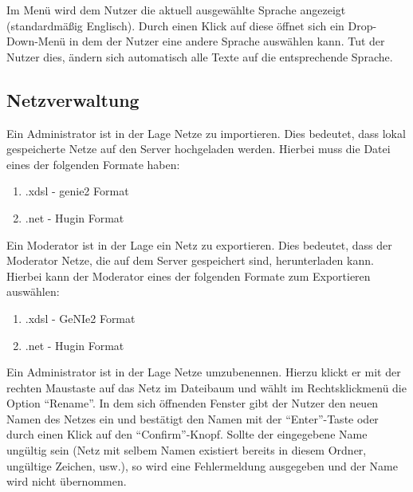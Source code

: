 \documentclass[parskip=full,11pt,twoside]{scrartcl}
\begin{document}
Im Menü wird dem Nutzer die aktuell ausgewählte Sprache angezeigt (standardmäßig Englisch). Durch einen Klick auf diese öffnet sich ein Drop-Down-Menü in dem der Nutzer eine andere Sprache auswählen kann. Tut der Nutzer dies, ändern sich automatisch alle Texte auf die entsprechende Sprache.

\pagebreak
\subsection{Netzverwaltung}  


Ein Administrator ist in der Lage Netze zu importieren. Dies bedeutet, dass lokal gespeicherte Netze auf den Server hochgeladen werden. Hierbei muss die Datei eines der folgenden Formate haben:
\begin{enumerate}
    \item .xdsl - \gls{genie2} Format
    \item .net - Hugin Format %
    
\end{enumerate}
Ein Moderator ist in der Lage ein Netz zu exportieren. Dies bedeutet, dass der Moderator Netze, die auf dem Server gespeichert sind, herunterladen kann. Hierbei kann der Moderator eines der folgenden Formate zum Exportieren auswählen:
\begin{enumerate}
    \item .xdsl - GeNIe2 Format
    \item .net - Hugin Format %
\end{enumerate}

Ein Administrator ist in der Lage Netze umzubenennen. Hierzu klickt er mit der rechten Maustaste auf das Netz im Dateibaum und wählt im Rechtsklickmenü die Option \enquote{Rename}. In dem sich öffnenden Fenster gibt der Nutzer den neuen Namen des Netzes ein und bestätigt den Namen mit der \enquote{Enter}-Taste oder durch einen Klick auf den \enquote{Confirm}-Knopf. Sollte der eingegebene Name ungültig sein (Netz mit selbem Namen existiert bereits in diesem Ordner, ungültige Zeichen, usw.), so wird eine Fehlermeldung ausgegeben und der Name wird nicht übernommen.
\end{document}
